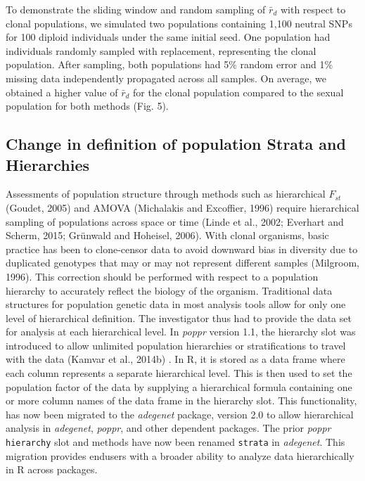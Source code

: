 \documentclass{frontiersSCNS} %
\begin{document}
To demonstrate the sliding window and random sampling of \(\bar{r}_d\)
with respect to clonal populations, we simulated two populations
containing 1,100 neutral SNPs for 100 diploid individuals under the same
initial seed. One population had individuals randomly sampled with
replacement, representing the clonal population. After sampling, both
populations had 5\% random error and 1\% missing data independently
propagated across all samples. On average, we obtained a higher value of
\(\bar{r}_d\) for the clonal population compared to the sexual
population for both methods (Fig. 5).

\subsection*{Change in definition of population Strata and
Hierarchies}\label{change-in-definition-of-population-strata-and-hierarchies}

Assessments of population structure through methods such as hierarchical
\(F_{st}\) (Goudet, 2005) and AMOVA (Michalakis and Excoffier, 1996)
require hierarchical sampling of populations across space or time (Linde
et al., 2002; Everhart and Scherm, 2015; Gr{ü}nwald and Hoheisel, 2006).
With clonal organisms, basic practice has been to clone-censor data to
avoid downward bias in diversity due to duplicated genotypes that may or
may not represent different samples (Milgroom, 1996). This correction
should be performed with respect to a population hierarchy to accurately
reflect the biology of the organism. Traditional data structures for
population genetic data in most analysis tools allow for only one level
of hierarchical definition. The investigator thus had to provide the
data set for analysis at each hierarchical level. In \emph{poppr}
version 1.1, the hierarchy slot was introduced to allow unlimited
population hierarchies or stratifications to travel with the data
(Kamvar et al., 2014b) . In R, it is stored as a data frame where each
column represents a separate hierarchical level. This is then used to
set the population factor of the data by supplying a hierarchical
formula containing one or more column names of the data frame in the
hierarchy slot. This functionality, has now been migrated to the
\emph{adegenet} package, version 2.0 to allow hierarchical analysis in
\emph{adegenet}, \emph{poppr}, and other dependent packages. The prior
\emph{poppr} \texttt{hierarchy} slot and methods have now been renamed
\texttt{strata} in \emph{adegenet}. This migration provides endusers
with a broader ability to analyze data hierarchically in R across
packages.
\end{document}
